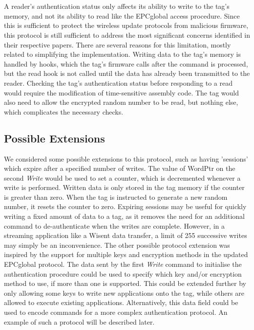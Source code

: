 \documentclass[journal]{IEEEtran}
\begin{document}
        \\\\
        A reader's authentication status only affects its ability to write to the tag's memory, and not its ability to read like the EPCglobal access procedure.
        Since this is sufficient to protect the wireless update protocols from malicious firmware, this protocol is still sufficient to address the most significant concerns identified in their respective papers.
        There are several reasons for this limitation, mostly related to simplifying the implementation.
        Writing data to the tag's memory is handled by hooks, which the tag's firmware calls after the command is processed, but the read hook is not called until the data has already been transmitted to the reader.
        Checking the tag's authentication status before responding to a read would require the modification of time-sensitive assembly code.
        The tag would also need to allow the encrypted random number to be read, but nothing else, which complicates the necessary checks.
    \subsection{Possible Extensions}
        We considered some possible extensions to this protocol, such as having 'sessions' which expire after a specified number of writes.
        The value of WordPtr on the second \textit{Write} would be used to set a counter, which is decremented whenever a write is performed.
        Written data is only stored in the tag memory if the counter is greater than zero.
        When the tag is instructed to generate a new random number, it resets the counter to zero.
        Expiring sessions may be useful for quickly writing a fixed amount of data to a tag, as it removes the need for an additional command to de-authenticate when the writes are complete.
        However, in a streaming application like a Wisent data transfer, a limit of 255 successive writes may simply be an inconvenience.
        The other possible protocol extension was inspired by the support for multiple keys and encryption methods in the updated EPCglobal protocol.
        The data sent by the first \textit{Write} command to initialise the authentication procedure could be used to specify which key and/or encryption method to use, if more than one is supported.
        This could be extended further by only allowing some keys to write new applications onto the tag, while others are allowed to execute existing applications.
        Alternatively, this data field could be used to encode commands for a more complex authentication protocol.
        An example of such a protocol will be described later.
\end{document}
